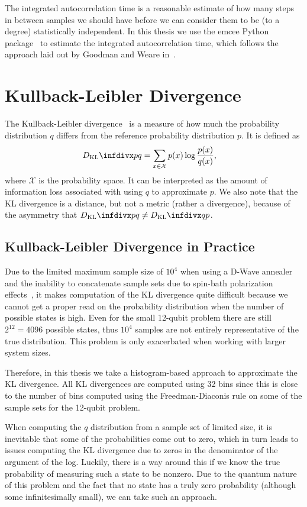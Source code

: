 The integrated autocorrelation time is a reasonable estimate of how many steps in between samples we should have before we can consider them to be (to a degree) statistically independent.
In this thesis we use the emcee Python package~\cite{python_emcee} to estimate the integrated autocorrelation time, which follows the approach laid out by Goodman and Weare in~\cite{goodman_weare_2010}.

\section{Kullback-Leibler Divergence}\label{app:kl_divergence}
The Kullback-Leibler divergence~\cite{kullback_1951} is a measure of how much the probability distribution \( q \) differs from the reference probability distribution \( p \).
It is defined as
\begin{align}
    \DKL{p}{q}
        &= \sum_{x\in\mathcal{X}} p(x) \log\frac{p(x)}{q(x)},
\end{align}
where \( \mathcal{X} \) is the probability space.
It can be interpreted as the amount of information loss associated with using \( q \) to approximate \( p \).
We also note that the KL divergence is a distance, but not a metric (rather a divergence), because of the asymmetry that \( \DKL{p}{q} \ne \DKL{q}{p} \).

\subsection{Kullback-Leibler Divergence in Practice}\label{app:kl_divergence_in_practice}
Due to the limited maximum sample size of \( 10^4 \) when using a D-Wave annealer and the inability to concatenate sample sets due to spin-bath polarization effects~\cite{pochart_2021}, it makes computation of the KL divergence quite difficult because we cannot get a proper read on the probability distribution when the number of possible states is high.
Even for the small 12-qubit problem there are still \( 2^{12} = 4096 \) possible states, thus \( 10^4 \) samples are not entirely representative of the true distribution.
This problem is only exacerbated when working with larger system sizes.

Therefore, in this thesis we take a histogram-based approach to approximate the KL divergence.
All KL divergences are computed using 32 bins since this is close to the number of bins computed using the Freedman-Diaconis rule on some of the sample sets for the 12-qubit problem.

When computing the \( q \) distribution from a sample set of limited size, it is inevitable that some of the probabilities come out to zero, which in turn leads to issues computing the KL divergence due to zeros in the denominator of the argument of the log.
Luckily, there is a way around this if we know the true probability of measuring such a state to be nonzero.
Due to the quantum nature of this problem and the fact that no state has a truly zero probability (although some infinitesimally small), we can take such an approach.

